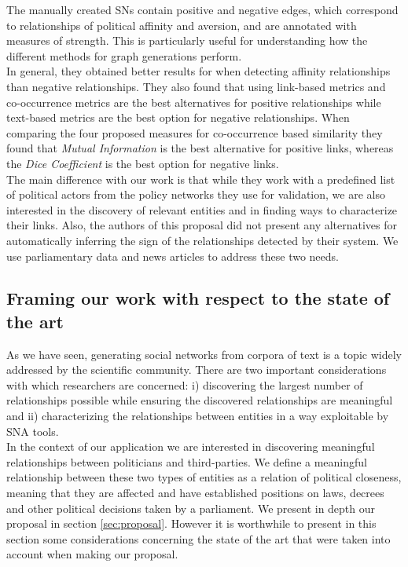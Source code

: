 The manually created SNs contain positive and negative edges, which correspond to relationships of political affinity and aversion, and are annotated with measures of strength. This is particularly useful for understanding how the different methods for graph generations perform. %
\\

In general, they obtained better results for when detecting affinity relationships than negative relationships. They also found that using link-based metrics and co-occurrence metrics are the best alternatives for positive relationships while text-based metrics are the best option for negative relationships. When comparing the four proposed measures for co-occurrence based similarity they found that \emph{Mutual Information} is the best alternative for positive links, whereas the \emph{Dice Coefficient} is the best option for negative links. \\
The main difference with our work is that while they work with a predefined list of political actors from the policy networks they use for validation, we are also interested in the discovery of relevant entities and in finding ways to characterize their links. Also, the authors of this proposal did not present any alternatives for automatically inferring the sign of the relationships detected by their system. We use parliamentary data and news articles to address these two needs.\\

\subsection{Framing our work with respect to the state of the art}\label{framing}
 
As we have seen, generating social networks from corpora of text is a topic widely addressed by the scientific community. There are two important considerations with which researchers are concerned: i) discovering the largest number of relationships possible while ensuring the discovered relationships are meaningful and ii) characterizing the relationships between entities in a way exploitable by SNA tools. \\

In the context of our application we are interested in discovering meaningful relationships between politicians and third-parties. We define a meaningful relationship between these two types of entities as a relation of political closeness, meaning that they are affected and have established positions on laws, decrees and other political decisions taken by a parliament. We present in depth our proposal in section \ref{sec:proposal}. However it is worthwhile to present in this section some considerations concerning the state of the art that were taken into account when making our proposal.\\


